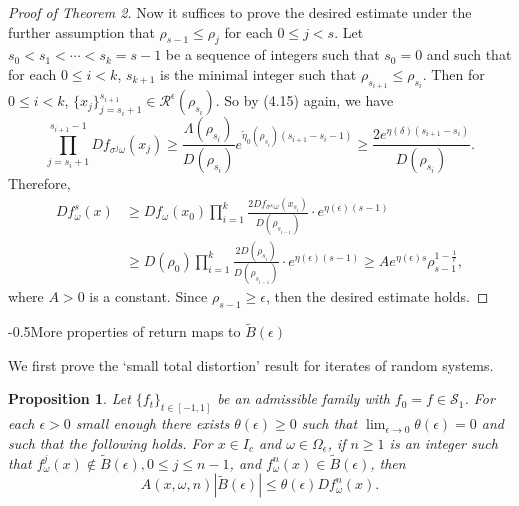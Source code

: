 \documentclass[11pt,oneside]{article}
\makeatletter
\theoremstyle{plain}
\newtheorem{prop}{Proposition}
\numberwithin{equation}{section}
\numberwithin{figure}{section}
\numberwithin{table}{section}
\renewcommand{\subsection}{\@startsection{subsection}{1}{0mm}
{-\baselineskip}{0.5\baselineskip}{\large\bf\leftline}}
\makeatother
\begin{document}
\begin{proof}[Proof of Theorem 2]
Now it suffices to prove the desired estimate under the further assumption that $\rho_{s-1} \leq \rho_j$ for each $0 \leq j < s$. Let $s_0 < s_1 < \cdots < s_k = s-1$ be a sequence of integers such that $s_0 = 0$ and such that for each $0 \leq i < k$, $s_{k+1}$ is the minimal integer such that $\rho_{s_{i+1}} \leq \rho_{s_i}$. Then for $0 \leq i < k$, $\{ x_j \}_{j = s_i+1}^{s_{i+1}} \in \mathcal R^{\epsilon} (\rho_{s_i})$. So by (4.15) again, we have
\[
\prod_{j = s_i +1}^{s_{i+1} -1} Df_{\sigma^j \omega}(x_j) \geq \frac{\Lambda(\rho_{s_i})}{D(\rho_{s_i})} e^{\tilde \eta_0(\rho_{s_i}) (s_{i+1} -s_i -1)} \geq \frac{2e^{\eta(\delta) (s_{i+1} -s_i)} }{D(\rho_{s_i})}.
\]
Therefore,
\begin{align*}
Df_{\omega}^s(x)& \geq Df_{\omega}(x_0) \prod_{i = 1}^k \frac{2 Df_{\sigma^{s_i} \omega}(x_{s_i} )}{D(\rho_{s_{i-1}})} \cdot e^{\eta(\epsilon) (s -1)} \\
& \geq D(\rho_0) \prod_{i = 1}^k \frac{2 D(\rho_{s_i})}{D(\rho_{s_{i-1}})} \cdot e^{\eta(\epsilon) (s -1)}  \geq A e^{\eta(\epsilon) s} \rho_{s-1}^{1 - \frac{1}{\ell}},
\end{align*}
where $A>0$ is a constant. Since $\rho_{s-1} \geq \epsilon$, then the desired estimate holds.

\end{proof}


\subsection{More properties of return maps to $\tilde B(\epsilon)$}


We first prove the `small total distortion' result for iterates of random systems.


\begin{prop}
Let $\{f_t \}_{t \in [-1, 1]} $ be an admissible family with $f_0 =f \in \mathcal S_1$. For each $\epsilon > 0$ small enough there exists $\theta(\epsilon) \geq 0$ such that $\lim_{\epsilon \to 0} \theta(\epsilon) =0$ and such that the following holds. For $x \in I_c$ and $\omega \in \Omega_{\epsilon}$, if $n \geq 1$ is an integer such that $f_{\omega}^j(x) \notin \tilde B(\epsilon), 0 \leq j \leq n-1$, and $f_{\omega}^n(x) \in \tilde B(\epsilon)$, then
\begin{equation}
A(x, \omega, n) |\tilde B(\epsilon)| \leq \theta(\epsilon) Df_{\omega}^n(x).
\end{equation}
\end{prop}
\end{document}

